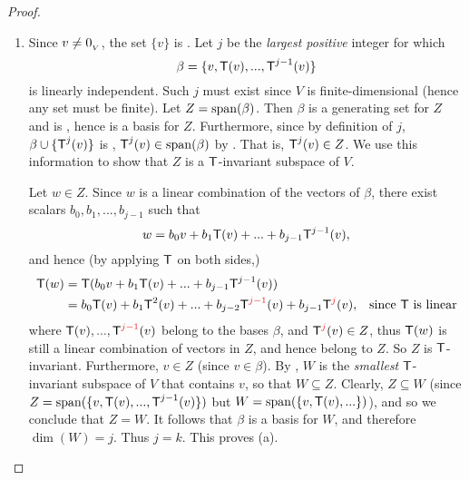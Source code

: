\begin{proof} \ 

\begin{enumerate}
\item Since \(v \ne 0_{_V}\), the set \(\{ v \}\) is \LID{}.
Let \(j\) be the \emph{largest positive} integer for which
\[
    \beta = \{ v, \textsf{T}(v), ..., \textsf{T}^{j - 1}(v) \}
\]
is linearly independent.
Such \(j\) must exist since \(V\) is finite-dimensional (hence any \LID{} set must be finite).
Let \(Z = \operatorname{span}(\beta)\).
Then \(\beta\) is a generating set for \(Z\) and is \LID{}, hence is a basis for \(Z\).
Furthermore, since by definition of \(j\), \(\beta \cup \{ \textsf{T}^j(v) \}\) is \LDP{}, \(\textsf{T}^j(v) \in \operatorname{span}(\beta)\) by .
That is, \(\textsf{T}^j(v) \in Z\).
We use this information to show that \(Z\) is a \(\textsf{T}\)-invariant subspace of \(V\).

Let \(w \in Z\).
Since \(w\) is a linear combination of the vectors of \(\beta\), there exist scalars \(b_0, b_1, ..., b_{j - 1}\) such that
\[
    w = b_0 v + b_1 \textsf{T}(v) + ... + b_{j - 1} \textsf{T}^{j - 1}(v),
\]
and hence (by applying \(\textsf{T}\) on both sides,)
\begin{align*}
    \T(w) & = \T(b_0 v + b_1 \T(v) + ... + b_{j - 1} \T^{j - 1}(v)) \\
          & = b_0 \T(v) + b_1 \T^2(v) + ... + b_{j - 2} \T^{\RED{j - 1}}(v) + b_{j - 1} \T^{\RED{j}}(v), & \text{since \(\T\) is linear}
\end{align*}
where \(\T(v), ..., \T^{\RED{j - 1}}(v)\) belong to the bases \(\beta\), and \(\T^{\RED{j}}(v) \in Z\), thus \(\textsf{T}(w)\) is still a linear combination of vectors in \(Z\), and hence belong to \(Z\).
So \(Z\) is \(\textsf{T}\)-invariant.
Furthermore, \(v \in Z\) (since \(v \in \beta\)).
By , \(W\) is the \emph{smallest} \(\textsf{T}\)-invariant subspace of \(V\) that contains \(v\), so that \(W \subseteq Z\).
Clearly, \(Z \subseteq W\) (since \(Z = \operatorname{span}(\{ v, \textsf{T}(v), ..., \textsf{T}^{j - 1}(v) \})\) but \(W = \operatorname{span}(\{ v, \textsf{T}(v), ... \})\)), and so we conclude that \(Z = W\).
It follows that \(\beta\) is a basis for \(W\), and therefore \(\dim(W) = j\).
Thus \(j = k\).
This proves (a).


\end{enumerate}
\end{proof}
